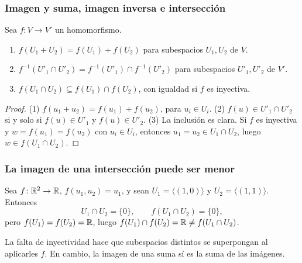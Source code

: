 \begin{frame}
    \frametitle{Imagen y suma, imagen inversa e intersección}

    \begin{proposition}
        Sea $f\colon V\to V'$ un homomorfismo.
        \begin{enumerate}[(1)]
            \item $f(U_1+U_2)=f(U_1)+f(U_2)$ para subespacios
            $U_1,U_2$ de $V$.
            \item $f^{-1}(U'_1\cap U'_2)=f^{-1}(U'_1)\cap f^{-1}(U'_2)$ para
            subespacios $U'_1,U'_2$ de $V'$.
            \item $f(U_1\cap U_2)\subseteq f(U_1)\cap f(U_2)$, con igualdad
            si $f$ es inyectiva.
        \end{enumerate}
    \end{proposition}

    \begin{proof}
        \alert{(1)} $f(u_1+u_2)=f(u_1)+f(u_2)$, para $u_i\in U_i$.
        \alert{(2)} $f(u)\in U'_1\cap U'_2$ si y solo si $f(u)\in U'_1$ y
        $f(u)\in U'_2$.
        \alert{(3)} La inclusión es clara. Si $f$ es inyectiva y
        $w=f(u_1)=f(u_2)$ con $u_i\in U_i$, entonces $u_1=u_2\in U_1\cap U_2$,
        luego $w\in f(U_1\cap U_2)$.
    \end{proof}
\end{frame}


\begin{frame}
    \frametitle{La imagen de una intersección puede ser menor}

    \begin{example}
        Sea $f\colon\mathbb{R}^2\to\mathbb{R}$, $f(u_1,u_2)=u_1$, y sean
        $U_1=\langle(1,0)\rangle$ y $U_2=\langle(1,1)\rangle$. Entonces
        \[
            U_1\cap U_2=\{0\},\qquad f(U_1\cap U_2)=\{0\},
        \]
        pero $f(U_1)=f(U_2)=\mathbb{R}$, luego
        $f(U_1)\cap f(U_2)=\mathbb{R}\neq f(U_1\cap U_2)$.
    \end{example}

    \medskip

    La falta de inyectividad hace que subespacios distintos se
    superpongan al aplicarles $f$. En cambio, la imagen de una suma sí es
    la suma de las imágenes.
\end{frame}


